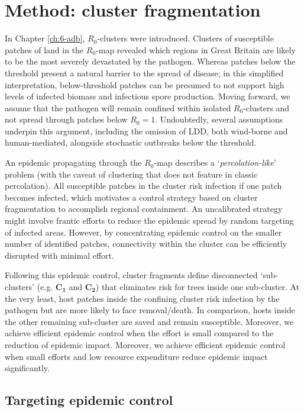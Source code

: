 \section{Method: cluster fragmentation}
\label{sec:fragmentation-method}

In Chapter \ref{ch:6-adb}, $R_0$-clusters were introduced.
Clusters of susceptible patches of land in the $R_0$-map revealed which regions in Great Britain are likely to be the most severely devastated by the pathogen. 
Whereas patches below the threshold present a natural barrier to the spread of disease;
in this simplified interpretation, below-threshold patches can be presumed to not support high levels of infected biomass and infectious spore production.
Moving forward, we assume that the pathogen will remain confined within isolated $R_0$-clusters and not spread through patches below $R_0=1$.
Undoubtedly, several assumptions underpin this argument, including the omission of LDD, both wind-borne and human-mediated, alongside stochastic outbreaks below the threshold.
 
An epidemic propagating through the $R_0$-map describes a `\textit{percolation-like}' problem (with the caveat of clustering that does not feature in classic percolation). All susceptible patches in the cluster risk infection if one patch becomes infected, which motivates a control strategy based on cluster fragmentation to accomplish regional containment. An uncalibrated strategy might involve frantic efforts to reduce the epidemic spread by random targeting of infected areas. However, by concentrating epidemic control on the smaller number of identified patches, connectivity within the cluster can be efficiently disrupted with minimal effort. 

Following this epidemic control, cluster fragments define disconnected `sub-clusters' (e.g. $\mathbf{C_1}$ and $\mathbf{C_2}$) that eliminates risk for trees inside one sub-cluster. At the very least, host patches inside the confining cluster risk infection by the pathogen but are more likely to face removal/death. In comparison, hosts inside the other remaining sub-cluster are saved and remain susceptible. Moreover, we achieve efficient epidemic control when the effort is small compared to the reduction of epidemic impact. Moreover, we achieve efficient epidemic control when small efforts and low resource expenditure reduce epidemic impact significantly.

\subsection{Targeting epidemic control}
\label{sec:fragmentation-method-1}

